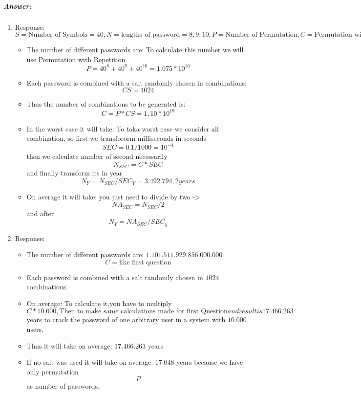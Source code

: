 \documentclass{article}
\begin{document}
            \subparagraph{Answer: }

            \begin{enumerate}
                \item Response: \[S= \text{Number of Symbols} = 40, N= \text{lengths of password} = {8,9,10}, P= \text{Number of Permutation}, C=\text{Permutation with salt}, CS=\text{Permutation of Salt} \]
                \begin{itemize}
                    \item The number of different passwords are: To calculate this number we will use Permutation with Repetition \[P=40^8+40^9+40^{10}=1.075*10^{16}\]
                    \item Each password is combined with a salt randomly chosen in  combinations: \[CS = 1024\]
                    \item Thus the number of combinations to be generated is:\[C= P*CS=1,10*10^{19}\]
                    \item In the worst case it will take: To taka worst case we consider all combination, so first we transfororm milliseconds in seconds  \[SEC = 0.1/1000 = 10^{-4}\] then we calculate number of second necessarily  \[N_{SEC} = C*SEC\] and finally transform its in year \[N_Y = N_{SEC}/SEC_Y = 3.492.794,2 years\]
                    \item On average it will take: you just need to divide by two -> \[NA_{SEC} = N_{SEC}/2\] and after \[N_Y = NA_{SEC}/SEC_y\]   
                \end{itemize}
                \item Response: 
                \begin{itemize}
                    \item The number of different passwords are: \(1.101.511.929.856.000.000\) \[C = \text{like first question}\]
                    \item Each password is combined with a salt randomly chosen in \(1024\) combinations.
                    \item On average: To calculate it,you have to multiply \[C*10.000,\text{Then to make same calculations made for first Question} and result is 17.466.263\] years to crack the password of one arbitrary user in a system with \(10.000\) users.
                    \item Thus it will take on average: \(17.466.263\) years
                    \item If no salt was used it will take on average: \(17.048\) years because we have only  permutation \[P\] as number of passwords.
                \end{itemize}
                

\end{enumerate}
\end{document}
